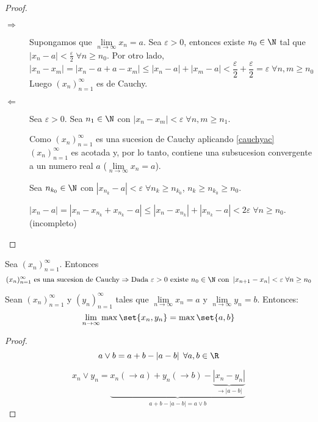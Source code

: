 \begin{proof}
	~
	\begin{description}
		\item[\(\Rightarrow\) ] Supongamos que  \(\lim\limits_{n \to \infty} x_n = a \). Sea \(\varepsilon > 0 \), entonces existe \(n_0 \in \N \) tal que \(\left\vert x_n - a  \right\vert < \frac{\varepsilon}{2} \; \forall n \geq n_0 \). Por otro lado, \[\left\vert x_n - x_m  \right\vert = \left\vert x_n - a + a - x_m  \right\vert \leq \left\vert x_n - a  \right\vert + \left\vert x_m - a  \right\vert < \frac{\varepsilon}{2} + \frac{\varepsilon}{2} = \varepsilon \; \forall n,m \geq n_0\] Luego \((x_n)^{\infty}_{n=1}\) es de Cauchy.

		\item[\(\Leftarrow\)] Sea \(\varepsilon > 0 \). Sea \(n_1 \in \N\) con \(\left\vert x_n - x_m  \right\vert < \varepsilon \; \forall n,m \geq n_1 \).

			Como \((x_n)^{\infty}_{n=1} \) es una sucesion de Cauchy aplicando \ref{cauchyac} \((x_n)^{\infty}_{n=1}  \) es acotada y, por lo tanto, contiene una subsucesion convergente a un numero real \(a \) (\(\lim\limits_{n \to \infty} x_n = a \)).

			Sea \(n_{k_0} \in \N \) con \(\left\vert x_{n_k} - a  \right\vert < \varepsilon \; \forall n_k \geq n_{k_0}\), \(n_k \geq n_{k_0} \geq n_0 \).

			\(\left\vert x_n - a  \right\vert = \left\vert x_n - x_{n_k} + x_{n_k} - a \right\vert \leq \left\vert x_n - x_{n_k } \right\vert + \left\vert x_{n_k} - a \right\vert < 2\varepsilon \; \forall n \geq n_0\). (incompleto)
	\end{description}

\end{proof}
\begin{remark}
	Sea \((x_n)^{\infty}_{n=1} \). Entonces
	\[
		(x_n)^{\infty}_{n=1} \text{ es una sucesion de Cauchy} \Rightarrow \text{Dada \(\varepsilon > 0 \) existe } n_0 \in \N \text{ con } \left\vert x_{n+1} - x_n  \right\vert < \varepsilon \; \forall n \geq n_0
	\]

\end{remark}

\begin{proposition}
	Sean \((x_n)^{\infty}_{n=1} \) y \((y_n)^{\infty}_{n=1} \) tales que \(\lim\limits_{n \to \infty} x_n = a \) y \(\lim\limits_{n \to \infty} y_n = b \). Entonces:
	\[
		\lim\limits_{n \to \infty} \max\set{x_n,y_n} = \max\set{a,b }
	\]
\end{proposition}
\begin{proof}
	\[a \vee b = a + b - \left\vert a - b  \right\vert \; \forall a,b \in \R \]

	\[x_n \vee y_n = \underbrace{x_n (\rightarrow a) + y_n (\rightarrow b) - \underbrace{\left\vert x_n - y_n  \right\vert}_{\rightarrow \left\vert a - b  \right\vert }}_{a + b - \left\vert a - b \right\vert = a \vee b} \]
\end{proof}
